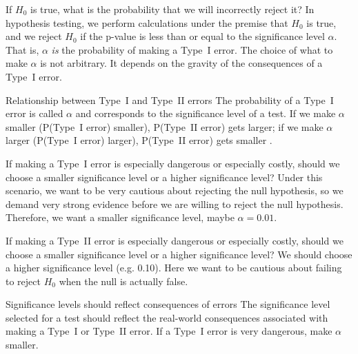 \label{significanceLevel}


If $H_0$ is true, what is the probability that we will incorrectly reject it? In hypothesis testing, we perform calculations under the premise that $H_0$ is true, and we reject $H_0$ if the p-value is less than or equal to the significance level $\alpha$. That is, $\alpha$ \emph{is} the probability of making a Type~I error. The choice of what to make $\alpha$ is not arbitrary. It depends on the gravity of the consequences of a Type~I error.

\begin{onebox}{Relationship between Type~I and Type~II errors}
The probability of a Type~I error is called $\alpha$ and corresponds to the significance level of a test.  If we make $\alpha$ smaller (P(Type~I error) smaller), P(Type~II error) gets larger; if we make  $\alpha$ larger (P(Type~I error) larger), P(Type~II error) gets smaller  .\end{onebox}

\begin{examplewrap}
\begin{nexample}{If making a Type~I error is especially dangerous or especially costly, should we choose a smaller significance level or a higher significance level?}
Under this scenario, we want to be very cautious about rejecting the null hypothesis, so we demand very strong evidence before we are willing to reject the null hypothesis. Therefore, we want a smaller significance level, maybe $\alpha = 0.01$.
\end{nexample}
\end{examplewrap}

\begin{examplewrap}
\begin{nexample}{If making a Type~II error is especially dangerous or especially costly, should we choose a smaller significance level or a higher significance level?}
We should choose a higher significance level (e.g. 0.10). Here we want to be cautious about failing to reject $H_0$ when the null is actually false.
\end{nexample}
\end{examplewrap}

\begin{onebox}{Significance levels should reflect consequences of errors}
The significance level selected for a test should reflect the real-world consequences associated with making a Type~I or Type~II error. If a Type~I error is very dangerous, make $\alpha$ smaller.\end{onebox}

